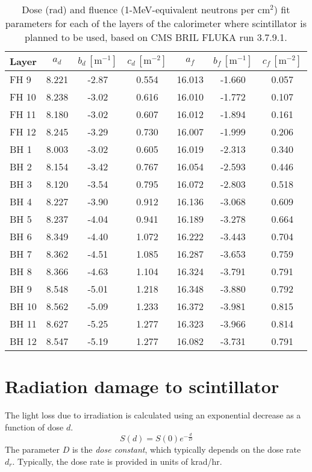 \documentclass{article}[12pt]
\begin{document}
\begin{table}[h]
\caption{Dose (rad) and fluence (1-MeV-equivalent neutrons per cm$^2$) fit parameters for each of the layers of the calorimeter where scintillator is planned to be used, based on CMS BRIL FLUKA run 3.7.9.1.}\label{tab:fits}
\begin{center}
\begin{tabular}{l|ccc|ccc}\hline
Layer & $a_d$ & $b_d\,[\mathrm{m}^{-1}]$ & $c_d\,[\mathrm{m}^{-2}]$ & $a_f$ & $b_f\,[\mathrm{m}^{-1}]$ & $c_f\,[\mathrm{m}^{-2}]$  \\ \hline
FH 9	& 8.221 & -2.87 & 0.554 & 16.013 & -1.660 & 0.057\\
FH 10	& 8.238 & -3.02 & 0.616 & 16.010 & -1.772 & 0.107\\
FH 11	& 8.180 & -3.02 & 0.607 & 16.012 & -1.894 & 0.161\\
FH 12	& 8.245 & -3.29 & 0.730 & 16.007 & -1.999 & 0.206\\
BH 1	& 8.003 & -3.02 & 0.605 & 16.019 & -2.313 & 0.340\\
BH 2	& 8.154 & -3.42 & 0.767 & 16.054 & -2.593 & 0.446\\
BH 3	& 8.120 & -3.54 & 0.795 & 16.072 & -2.803 & 0.518\\
BH 4	& 8.227 & -3.90 & 0.912 & 16.136 & -3.068 & 0.609\\
BH 5	& 8.237 & -4.04 & 0.941 & 16.189 & -3.278 & 0.664\\
BH 6	& 8.349 & -4.40 & 1.072 & 16.222 & -3.443 & 0.704\\
BH 7	& 8.362 & -4.51 & 1.085 & 16.287 & -3.653 & 0.759\\
BH 8	& 8.366 & -4.63 & 1.104 & 16.324 & -3.791 & 0.791\\
BH 9	& 8.548 & -5.01 & 1.218 & 16.348 & -3.880 & 0.792\\
BH 10	& 8.562 & -5.09 & 1.233 & 16.372 & -3.981 & 0.815\\
BH 11	& 8.627 & -5.25 & 1.277 & 16.323 & -3.966 & 0.814\\
BH 12	& 8.547 & -5.19 & 1.277 & 16.082 & -3.731 & 0.791\\
\hline
\end{tabular}
\end{center}
\end{table}

\section{Radiation damage to scintillator}

The light loss due to irradiation is calculated using an exponential decrease as a function of dose $d$.
\[
S(d) = S(0) e^{-\frac{d}{D}}
\]
The parameter $D$ is the \emph{dose constant}, which typically depends
on the dose rate $d_r$.  Typically, the dose rate is provided in units
of krad/hr.
\end{document}
